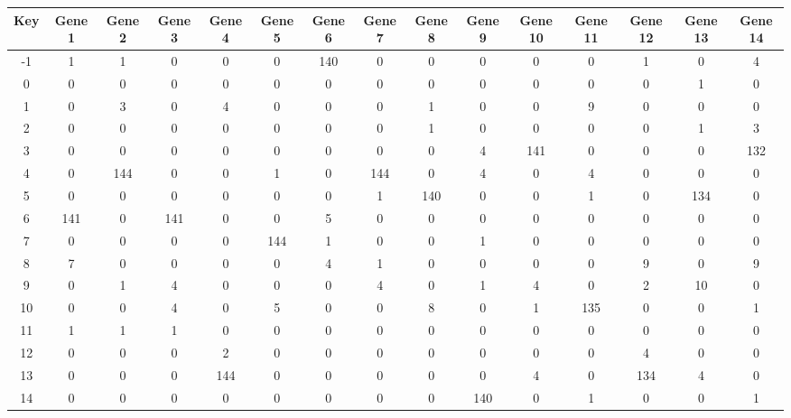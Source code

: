 \begin{tabular}{|c|c|c|c|c|c|c|c|c|c|c|c|c|c|c|}
\hline
Key & Gene 1 & Gene 2 & Gene 3 & Gene 4 & Gene 5 & Gene 6 & Gene 7 & Gene 8 & Gene 9 & Gene 10 & Gene 11 & Gene 12 & Gene 13 & Gene 14 \\
\hline
-1 & 1 & 1 & 0 & 0 & 0 & 140 & 0 & 0 & 0 & 0 & 0 & 1 & 0 & 4 \\
0 & 0 & 0 & 0 & 0 & 0 & 0 & 0 & 0 & 0 & 0 & 0 & 0 & 1 & 0 \\
1 & 0 & 3 & 0 & 4 & 0 & 0 & 0 & 1 & 0 & 0 & 9 & 0 & 0 & 0 \\
2 & 0 & 0 & 0 & 0 & 0 & 0 & 0 & 1 & 0 & 0 & 0 & 0 & 1 & 3 \\
3 & 0 & 0 & 0 & 0 & 0 & 0 & 0 & 0 & 4 & 141 & 0 & 0 & 0 & 132 \\
4 & 0 & 144 & 0 & 0 & 1 & 0 & 144 & 0 & 4 & 0 & 4 & 0 & 0 & 0 \\
5 & 0 & 0 & 0 & 0 & 0 & 0 & 1 & 140 & 0 & 0 & 1 & 0 & 134 & 0 \\
6 & 141 & 0 & 141 & 0 & 0 & 5 & 0 & 0 & 0 & 0 & 0 & 0 & 0 & 0 \\
7 & 0 & 0 & 0 & 0 & 144 & 1 & 0 & 0 & 1 & 0 & 0 & 0 & 0 & 0 \\
8 & 7 & 0 & 0 & 0 & 0 & 4 & 1 & 0 & 0 & 0 & 0 & 9 & 0 & 9 \\
9 & 0 & 1 & 4 & 0 & 0 & 0 & 4 & 0 & 1 & 4 & 0 & 2 & 10 & 0 \\
10 & 0 & 0 & 4 & 0 & 5 & 0 & 0 & 8 & 0 & 1 & 135 & 0 & 0 & 1 \\
11 & 1 & 1 & 1 & 0 & 0 & 0 & 0 & 0 & 0 & 0 & 0 & 0 & 0 & 0 \\
12 & 0 & 0 & 0 & 2 & 0 & 0 & 0 & 0 & 0 & 0 & 0 & 4 & 0 & 0 \\
13 & 0 & 0 & 0 & 144 & 0 & 0 & 0 & 0 & 0 & 4 & 0 & 134 & 4 & 0 \\
14 & 0 & 0 & 0 & 0 & 0 & 0 & 0 & 0 & 140 & 0 & 1 & 0 & 0 & 1 \\
\hline
\end{tabular}